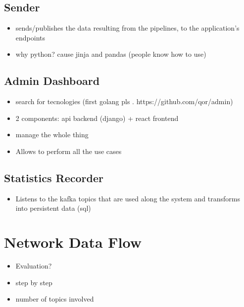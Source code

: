 \subsection{Sender}
\begin{itemize}
    \item sends/publishes the data resulting from the pipelines, to the application's endpoints
    \item why python? cause jinja and pandas (people know how to use)
\end{itemize}

\subsection{Admin Dashboard}

\begin{itemize}
    \item search for tecnologies (first golang pls . https://github.com/qor/admin)
    \item 2 components: api backend (django) + react frontend
    \item manage the whole thing
    \item Allows to perform all the use cases
\end{itemize}

\subsection{Statistics Recorder}
\begin{itemize}
    \item Listens to the kafka topics that are used along the system and transforms into persistent data (sql)
\end{itemize}

\section{Network Data Flow}
\begin{itemize}
    \item Evaluation?
    \item step by step
    \item number of topics involved
\end{itemize}
